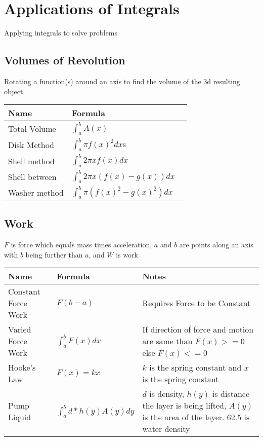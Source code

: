 \documentclass[17pt]{extarticle}
\begin{document}
\section{Applications of Integrals}
Applying integrals to solve problems
\subsection{Volumes of Revolution}
Rotating a function(s) around an axis to find the volume of the 3d resulting object
\renewcommand{\arraystretch}{2}
\begin{table}[H]
\centering
\begin{tabular}{|l|l|l|}
\hline
\rowcolor{githublightgray}
Name & Formula\\
\hline
Total Volume & $\int_{a}^{b}A(x)$\\
\hline
Disk Method &$\int_{a}^{b}\pi f(x)^2dx$s\\
\hline
Shell method &$\int_{a}^{b}2\pi xf(x)dx$\\
\hline
Shell between &$\int_{a}^{b}2\pi x(f(x)-g(x))dx$\\
\hline
Washer method &$\int_{a}^{b}\pi(f(x)^2-g(x)^2)dx$\\
\hline
\end{tabular}
\end{table}

\clearpage
\subsection{Work}
$F$ is force which equals mass times acceleration, $a$ and $b$ are points along an axis with $b$ being further than $a$, and $W$ is work\\
\renewcommand{\arraystretch}{2}
\begin{table}[H]
\centering
\begin{tabular}{|l|l|l|}
\hline
\rowcolor{githublightgray}
Name & Formula & Notes\\
\hline
Constant Force Work&$F(b-a)$&Requires Force to be Constant\\
\hline
Varied Force Work&$\int_{a}^{b}F(x)dx$&\makecell[l]{If direction of force and motion are \\same than $F(x)>=0$ else $F(x)<=0$}\\
\hline
Hooke's Law&$F(x)=kx$&\makecell[l]{$k$ is the spring constant and $x$ is the \\spring constant}\\
\hline
Pump Liquid&$\int_{a}^{b}d*h(y)A(y)dy$&\makecell[l]{$d$ is density, $h(y)$ is distance the layer\\ is being lifted, $A(y)$ is the area of the \\layer. 62.5 is water density}\\
\hline
\end{tabular} 
\end{table}
\end{document}
